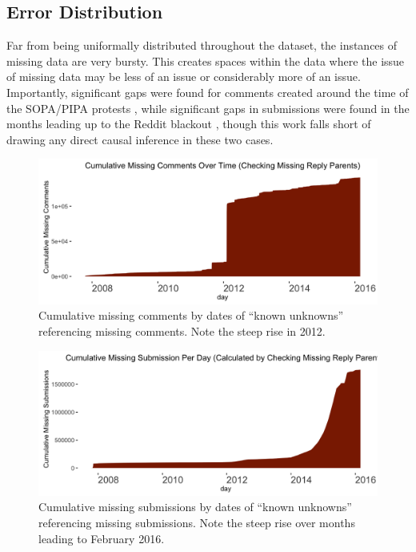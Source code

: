 \documentclass[letterpaper,12pt]{article}
\begin{document}
\subsection{Error Distribution}

Far from being uniformally distributed throughout the dataset, the instances of missing data are very bursty. This creates spaces within the data where the issue of missing data may be less of an issue or considerably more of an issue. Importantly, significant gaps were found for comments created around the time of the SOPA/PIPA protests \cite{benkler2015social}, while significant gaps in submissions were found in the months leading up to the Reddit blackout \cite{matias2016going}, though this work falls short of drawing any direct causal inference in these two cases.

\begin{figure}[h]
  \centering
  \includegraphics[width=\textwidth]{cumulative_missing_comments_time}
  \caption{Cumulative missing comments by dates of ``known unknowns'' referencing missing comments. Note the steep rise in 2012.}
  \label{fig:cumulative_missing_comments_time}
\end{figure}

\begin{figure}[h]
  \centering
  \includegraphics[width=\textwidth]{cumulative_missing_submissions_time}
  \caption{Cumulative missing submissions by dates of ``known unknowns'' referencing missing submissions. Note the steep rise over months leading to February 2016.}
  \label{fig:cumulative_missing_submissions_time}
\end{figure}
\end{document}
